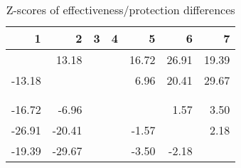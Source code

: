 \begin{table}[ht]
\centering
\begin{tabular}{rrrrrrr}
  \hline
1 & 2 & 3 & 4 & 5 & 6 & 7 \\ 
  \hline
 & 13.18 &  &  & 16.72 & 26.91 & 19.39 \\ 
  -13.18 &  &  &  & 6.96 & 20.41 & 29.67 \\ 
   &  &  &  &  &  &  \\ 
   &  &  &  &  &  &  \\ 
  -16.72 & -6.96 &  &  &  & 1.57 & 3.50 \\ 
  -26.91 & -20.41 &  &  & -1.57 &  & 2.18 \\ 
  -19.39 & -29.67 &  &  & -3.50 & -2.18 &  \\ 
   \hline
\end{tabular}
\caption{Z-scores of effectiveness/protection differences} 
\end{table}
